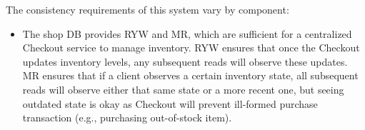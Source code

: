 %
%
%

The consistency requirements of this system vary by component:

\begin{itemize}
\item The shop DB provides RYW and MR, which are sufficient for
  a centralized Checkout service to manage inventory.
  RYW ensures that once the Checkout updates inventory levels,
  any subsequent reads will observe these updates. MR ensures that
  if a client observes a certain inventory state, all subsequent
  reads will observe either that same state or a more recent one,
  but seeing outdated state is okay as Checkout will prevent
  ill-formed purchase transaction (e.g., purchasing out-of-stock item).
\end{itemize}

